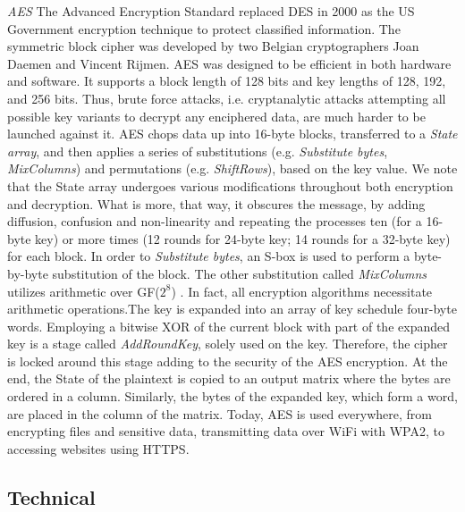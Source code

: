 \textit{AES} The Advanced Encryption Standard replaced DES in 2000 as the US Government encryption technique to protect classified information. The symmetric block cipher was developed by two Belgian cryptographers Joan Daemen and Vincent Rijmen. AES was designed to be efficient in both hardware and software. It supports a block length of 128 bits and key lengths of 128, 192, and 256 bits. Thus, brute force attacks, i.e. cryptanalytic attacks attempting all possible key variants to decrypt any enciphered data, are much harder to be launched against it. AES chops data up into 16-byte blocks, transferred to a \emph{State array}, and then applies a series of substitutions (e.g. \emph{Substitute bytes}, \emph{MixColumns}) and permutations (e.g. \emph{ShiftRows}), based on the key value. We note that the State array undergoes various modifications throughout both encryption and decryption. What is more, that way, it obscures the message, by adding diffusion, confusion and non-linearity and repeating the processes ten (for a 16-byte key) or more times (12 rounds for 24-byte key; 14 rounds for a 32-byte key) for each block. In order to \emph{Substitute bytes}, an S-box is used to perform a byte-by-byte substitution of the block. The other substitution called \emph{MixColumns} utilizes arithmetic over GF($2^{8}$) \cite{stallings2017-a}. In fact, all encryption algorithms necessitate arithmetic operations.The key is expanded into an array of key schedule four-byte words. Employing a bitwise XOR of the current block with part of the expanded key is a stage called \emph{AddRoundKey}, solely used on the key. Therefore, the cipher is locked around this stage adding to the security of the AES encryption.  At the end, the State of the plaintext is copied to an output matrix where the bytes are ordered in a column. Similarly, the bytes of the expanded key, which form a word, are placed in the column of the matrix. Today, AES is used everywhere, from encrypting files and sensitive data, transmitting data over WiFi with WPA2, to accessing websites using HTTPS. 

\subsection{Technical}

